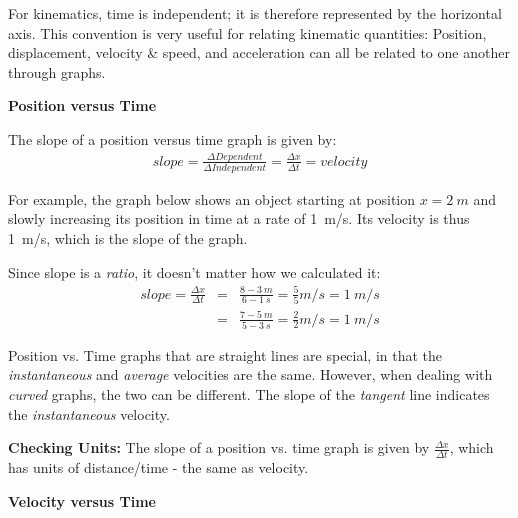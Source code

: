 \documentclass[12pt]{article}
\begin{document}
\begin{center}\end{center}

For kinematics, time is independent; it is therefore represented by the horizontal axis. This convention is very useful for relating kinematic quantities: Position, displacement, velocity \& speed, and acceleration can all be related to one another through graphs.

\noindent\textbf{\large Position versus Time}

The slope of a position versus time graph is given by:
\begin{eqnarray}
slope = \frac{\Delta Dependent}{\Delta Independent} = \frac{\Delta x}{\Delta t} = velocity \nonumber
\end{eqnarray}

For example, the graph below shows an object starting at position $x=2~m$ and slowly increasing its position in time at a rate of 1~m/s. Its velocity is thus 1~m/s, which is the slope of the graph.

\begin{center}\end{center}

Since slope is a \textit{ratio}, it doesn't matter how we calculated it:
\begin{eqnarray}
slope = \frac{\Delta x}{\Delta t} &=& \frac{8-3~m}{6-1~s} = \frac{5}{5} m/s = 1~m/s\nonumber\\
&=& \frac{7-5~m}{5-3~s} = \frac{2}{2} m/s = 1~m/s\nonumber
\end{eqnarray}

Position vs. Time graphs that are straight lines are special, in that the \textit{instantaneous} and \textit{average} velocities are the same. However, when dealing with \textit{curved} graphs, the two can be different. The slope of the \textit{tangent} line indicates the \textit{instantaneous} velocity.

\begin{center}\end{center}


\textbf{Checking Units:} The slope of a position vs. time graph is given by $\frac{\Delta x}{\Delta t}$, which has units of distance/time - the same as velocity.
\vspace{0.2in}

\noindent\textbf{\large Velocity versus Time}
\end{document}
